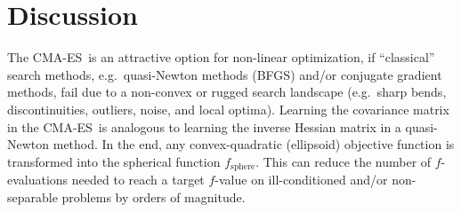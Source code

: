\documentclass{article} %
\newcommand{\bookchapter}[1]{{#1}}
\newcommand{\sstrich}[1]{{-}\linebreak[2]#1}
\newcommand{\ve}[1]{\mathchoice{\mbox{\boldmath$\displaystyle#1$}}
  {\mbox{\boldmath$\textstyle#1$}} {\mbox{\boldmath$\scriptstyle#1$}}
  {\mbox{\boldmath$\scriptscriptstyle#1$}}}
\newcommand{\ma}[1]{\mathchoice{\mbox{\boldmath$\displaystyle#1$}}
  {\mbox{\boldmath$\textstyle#1$}} {\mbox{\boldmath$\scriptstyle#1$}}
  {\mbox{\boldmath$\scriptscriptstyle#1$}}}
\newcommand{\fsphere}{f_{\mathrm{sphere}}}
\newcommand{\cma}{CMA-ES}
\begin{document}
\newcommand{\va}{\ve{a}} \newcommand{\vx}{\ve{x}}
\newcommand{\mA}{\ma{A}}
\section{Discussion\bookchapter{}\label{secdiscussion}}
The \cma\ is an attractive option for non-linear
  optimization, if ``classical'' search methods, e.g.\ quasi-Newton
  methods (BFGS) and/or conjugate gradient methods, fail due to a
  non-convex or rugged search landscape (e.g.\ sharp bends,
  discontinuities, outliers, noise, and local optima). Learning the
  covariance matrix in the \cma\ is analogous to learning the inverse
  Hessian matrix in a quasi-Newton method. In the end, any
  con\-vex\sstrich{quadratic} (ellipsoid) objective function is
  transformed into the spherical function $\fsphere$. This can reduce 
  the number of $f$-evaluations needed to reach a target $f$-value 
  on ill-conditioned and/or non-separable problems by
  orders of magnitude.
\end{document}
